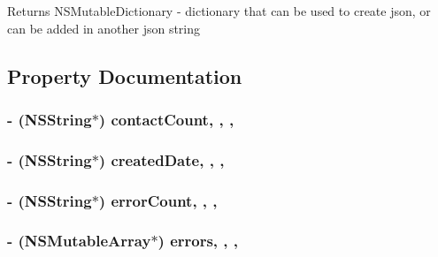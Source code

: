\begin{DoxyReturn}{Returns}
N\-S\-Mutable\-Dictionary -\/ dictionary that can be used to create json, or can be added in another json string 
\end{DoxyReturn}


\subsection{Property Documentation}
\hypertarget{interface_activity_ab9ad52e8f64b80becf9be642f1d5d786}{
\subsubsection[{contact\-Count}]{\setlength{\rightskip}{0pt plus 5cm}-\/ (N\-S\-String$\ast$) contact\-Count\hspace{0.3cm}{\ttfamily [read]}, {\ttfamily [write]}, {\ttfamily [nonatomic]}, {\ttfamily [strong]}}}\label{interface_activity_ab9ad52e8f64b80becf9be642f1d5d786}
\hypertarget{interface_activity_a3b0d23eb3c06d0854f0e7f63701f8749}{
\subsubsection[{created\-Date}]{\setlength{\rightskip}{0pt plus 5cm}-\/ (N\-S\-String$\ast$) created\-Date\hspace{0.3cm}{\ttfamily [read]}, {\ttfamily [write]}, {\ttfamily [nonatomic]}, {\ttfamily [strong]}}}\label{interface_activity_a3b0d23eb3c06d0854f0e7f63701f8749}
\hypertarget{interface_activity_abe1f522a0ec0a7c3e379273838a4da45}{
\subsubsection[{error\-Count}]{\setlength{\rightskip}{0pt plus 5cm}-\/ (N\-S\-String$\ast$) error\-Count\hspace{0.3cm}{\ttfamily [read]}, {\ttfamily [write]}, {\ttfamily [nonatomic]}, {\ttfamily [strong]}}}\label{interface_activity_abe1f522a0ec0a7c3e379273838a4da45}
\hypertarget{interface_activity_af4fc739f25f0e96f0a044a00e596fe5e}{
\subsubsection[{errors}]{\setlength{\rightskip}{0pt plus 5cm}-\/ (N\-S\-Mutable\-Array$\ast$) errors\hspace{0.3cm}{\ttfamily [read]}, {\ttfamily [write]}, {\ttfamily [nonatomic]}, {\ttfamily [strong]}}}\label{interface_activity_af4fc739f25f0e96f0a044a00e596fe5e}
